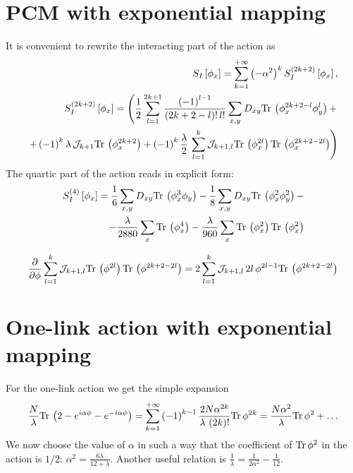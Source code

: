 \documentclass[12pt]{article}
\newcommand{\lr}[1]{ \left( #1 \right) }
\newcommand{\lrs}[1]{ \left[ #1 \right] }
\newcommand{\tr}{ {\rm Tr} \, }
\begin{document}
\section{PCM with exponential mapping}

It is convenient to rewrite the interacting part of the action as
\begin{eqnarray}
\label{pcm_action_int}
 S_I\lrs{\phi_x}
 = \sum\limits_{k=1}^{+\infty} \lr{- \alpha^2}^{k} S_I^{\lr{2k+2}}\lrs{\phi_x} ,
 \nonumber \\
 S_I^{\lr{2k+2}}\lrs{\phi_x} =
 \left(
  \frac{1}{2} \sum\limits_{l=1}^{2 k + 1} \frac{\lr{-1}^{l-1}}{\lr{2 k + 2 - l}! \, l!}
  \sum\limits_{x,y} D_{x y} \tr\lr{\phi_x^{2 k + 2 - l} \phi_y^l }
   + \right. \nonumber \\ \left. +
  \lr{-1}^{k} \lambda \, \mathcal{J}_{k+1} \tr\lr{\phi_x^{2 k+2}}
  +
 \lr{-1}^{k} \frac{\lambda}{2} \, \sum\limits_{l=1}^{k} \mathcal{J}_{k+1,l} \tr\lr{\phi_x^{2 l}} \tr\lr{\phi_x^{2 k + 2 - 2 l}}
  \right)
\end{eqnarray}
The quartic part of the action reads in explicit form:
\begin{eqnarray}
\label{pcm_action_int_quartic}
 S_I^{\lr{4}}\lrs{\phi_x}
 = 
 \frac{1}{6} \sum\limits_{x, y} D_{x y} \tr\lr{\phi_x^3 \phi_y}
 -
 \frac{1}{8} \sum\limits_{x, y} D_{x y} \tr\lr{\phi_x^2 \phi_y^2}
 - \nonumber \\ -
 \frac{\lambda}{2880} \sum\limits_x \tr\lr{\phi_x^4}
 -
 \frac{\lambda}{960} \sum\limits_x \tr\lr{\phi_x^2} \tr\lr{\phi_x^2} 
\end{eqnarray} 

\begin{eqnarray}
\label{double_trace_derivative}
 \frac{\partial}{\partial \phi}
 \sum\limits_{l=1}^{k} \mathcal{J}_{k+1,l} 
 \tr\lr{\phi^{2 l}} \tr\lr{\phi^{2 k + 2 - 2 l}}
 =
 2 \sum\limits_{l=1}^k \mathcal{J}_{k+1,l} \, 2 l \, \phi^{2 l - 1} \tr\lr{\phi^{2 k + 2 - 2 l}}
\end{eqnarray}

\section{One-link action with exponential mapping}
\label{sec:one_link}

For the one-link action we get the simple expansion
\begin{eqnarray}
\label{single_link_action}
 \frac{N}{\lambda} \tr\lr{2 - e^{i \alpha \phi} - e^{-i \alpha \phi}}
 =
 \sum\limits_{k=1}^{+\infty} \lr{-1}^{k-1} \frac{2 N \alpha^{2 k}}{\lambda \, \lr{2 k}!} \tr{\phi^{2 k}}
 =
 \frac{N \alpha^2}{\lambda} \tr{\phi^2} + \ldots
\end{eqnarray}
We now choose the value of $\alpha$ in such a way that the coefficient of $\tr\phi^2$ in the action is $1/2$: $\alpha^2 = \frac{6 \lambda}{12 + \lambda}$. Another useful relation is $\frac{1}{\lambda} = \frac{1}{2 \alpha^2} - \frac{1}{12}$.
\end{document}
